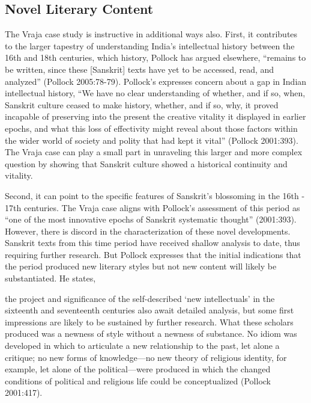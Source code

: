 \subsection*{Novel Literary Content}
\vskip -15pt

The Vraja case study is instructive in additional ways also. First, it contributes to the larger tapestry of understanding India’s intellectual history between the 16th and 18th centuries, which history, Pollock has argued elsewhere, “remains to be written, since these [Sanskrit] texts have yet to be accessed, read, and analyzed” (Pollock 2005:78-79). Pollock’s expresses concern about a gap in Indian intellectual history, “We have no clear understanding of whether, and if so, when, Sanskrit culture ceased to make history, whether, and if so, why, it proved incapable of preserving into the present the creative vitality it displayed in earlier epochs, and what this loss of effectivity might reveal about those factors within the wider world of society and polity that had kept it vital” (Pollock 2001:393). The Vraja case can play a small part in unraveling this larger and more complex question by showing that Sanskrit culture showed a historical continuity and vitality. 

Second, it can point to the specific features of Sanskrit’s blossoming in the 16th - 17th centuries. The Vraja case aligns with Pollock’s assessment of this period as “one of the most innovative epochs of Sanskrit systematic thought” (2001:393). However, there is discord in the characterization of these novel developments. Sanskrit texts from this time period have received shallow analysis to date, thus requiring further research. But Pollock expresses that the initial indications that the period produced new literary styles but not new content will likely be substantiated. He states, 
\begin{myquote}
\eleven
the project and significance of the self-described ‘new intellectuals’ in the sixteenth and seventeenth centuries also await detailed analysis, but some first impressions are likely to be sustained by further research. What these scholars produced was a newness of style without a newness of substance. No idiom was developed in which to articulate a new relationship to the past, let alone a critique; no new forms of knowledge—no new theory of religious identity, for example, let alone of the political—were produced in which the changed conditions of political and religious life could be conceptualized \hfill(Pollock 2001:417). 
\end{myquote}

